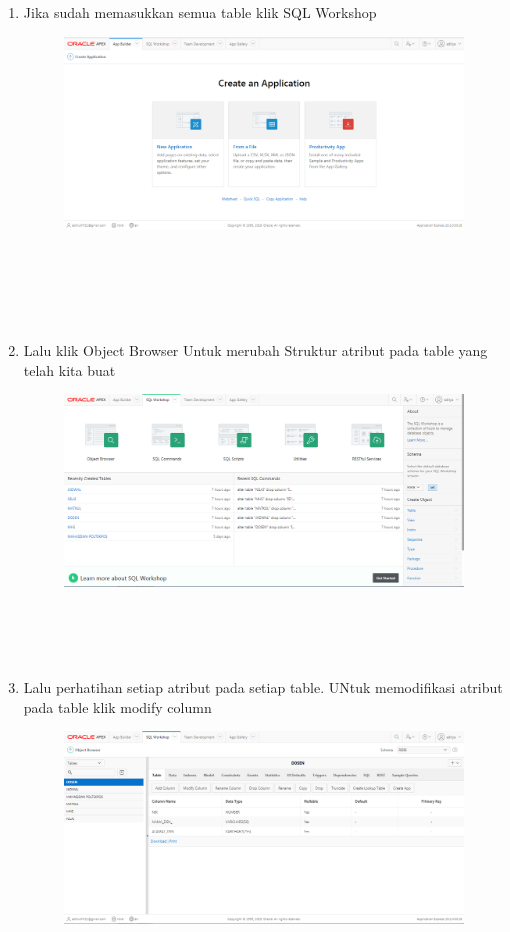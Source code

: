 \documentclass[12pt, times new roman, a4paper]{article}
\begin{document}
\begin{enumerate}
\item Jika sudah memasukkan semua table klik SQL Workshop
\begin{figure} [h]
	\centering
		\includegraphics[scale=0.4]{gambar/4}
\end{figure}
\\
\\
\\
\\
\item Lalu klik Object Browser Untuk merubah Struktur atribut pada table yang telah kita buat
\begin{figure} [h]
	\centering
		\includegraphics[scale=0.4]{gambar/6}
\end{figure}
\\
\\
\\
\item Lalu perhatihan setiap atribut pada setiap table. UNtuk memodifikasi atribut pada table klik modify column
\begin{figure} [h]
	\centering
		\includegraphics[scale=0.4]{gambar/7}

\end{figure}
\end{enumerate}
\end{document}

